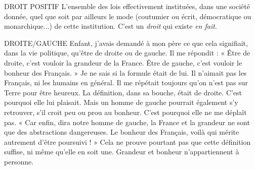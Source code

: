 DROIT POSITIF L'ensemble des lois effectivement instituées, dans une
société donnée, quel que soit par ailleurs le mode (coutumier
ou écrit, démocratique ou monarchique...) de cette institution. C’est un
{\it droit} qui existe {\it en fait}.

DROITE/GAUCHE Enfant, j'avais demandé à mon père ce que cela signifiait,
dans la vie politique, qu'être de droite ou de
gauche. Il me répondit : « Être de droite, c’est vouloir la grandeur de la France.
Être de gauche, c’est vouloir le bonheur des Français. » Je ne sais si la formule
était de lui. Il n’aimait pas les Français, ni les humains en général. Il me répétait
toujours qu’on n’est pas sur Terre pour être heureux. La définition, dans sa
bouche, était de droite. C’est pourquoi elle lui plaisait. Mais un homme de
gauche pourrait également s’y retrouver, s’il croit peu ou prou au bonheur.
C’est pourquoi elle ne me déplaît pas. « Car enfin, dira notre homme de
gauche, la France et la grandeur ne sont que des abstractions dangereuses. Le
bonheur des Français, voilà qui mérite autrement d’être poursuivi ! » Cela ne
prouve pourtant pas que cette définition suffise, ni même qu’elle en soit une.
Grandeur et bonheur n’appartiennent à personne.

